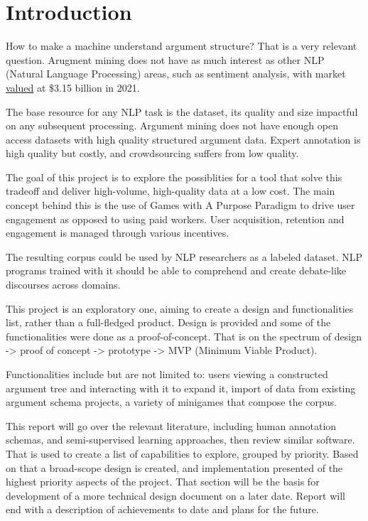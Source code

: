 \documentclass{article}
\begin{document}
\newpage

\tableofcontents

\newpage

\chapter{Introduction}
How to make a machine understand argument structure?
That is a very relevant question. Arugment mining does not have as much interest as other NLP (Natural Language Processing) areas, such as sentiment analysis, with market \href{https://www.polarismarketresearch.com/industry-analysis/sentiment-analytics-market}{valued} at \$3.15 billion in 2021.

The base resource for any NLP task is the dataset, its quality and size impactful on any subsequent processing. Argument mining does not have enough open access datasets with high quality structured argument data.  Expert annotation is high quality but costly, and crowdsourcing suffers from low quality. 

The goal of this project is to explore the possiblities for a tool that solve this tradeoff and deliver high-volume, high-quality data at a low cost. 
The main concept behind this is the use of Games with A Purpose Paradigm to drive user engagement as opposed to using paid workers. User acquisition, retention and engagement is managed through various incentives. 

The resulting corpus could be used by NLP researchers as a labeled dataset. NLP programs trained with it should be able to comprehend and create debate-like discourses across domains.

This project is an exploratory one, aiming to create a design and functionalities list, rather than a full-fledged product.
Design is provided and some of the functionalities were done as a proof-of-concept. 
That is on the spectrum of design -> proof of concept -> prototype -> MVP (Minimum Viable Product).

Functionalities include but are not limited to: users viewing a constructed argument tree and interacting with it to expand it, import of data from existing argument schema projects, a variety of minigames that compose the corpus. 

This report will go over the relevant literature, including human annotation schemas, and semi-supervised learning approaches, then review similar software. That is used to create a list of capabilities to explore, grouped by priority. Based on that a broad-scope design is created, and implementation presented of the highest priority aspects of the project.
That section will be the basis for development of a more technical design document on a later date.
Report will end with a description of achievements to date and plans for the future.
\end{document}
